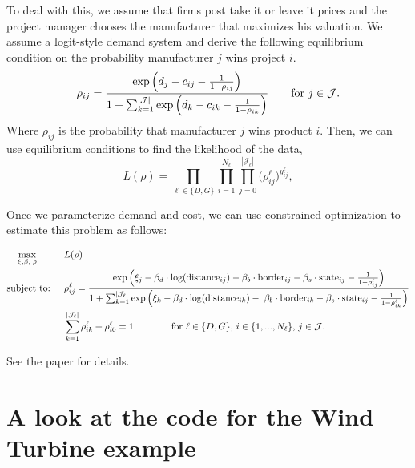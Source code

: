 \documentclass[twoside]{article}
\begin{document}
To deal with this, we assume that firms post take it or leave it prices and the project
manager chooses the manufacturer that maximizes his valuation. We assume a logit-style demand system and derive the 
following equilibrium condition on the probability manufacturer $j$ wins project $i$.   
\begin{equation*}
\rho_{ij}=\frac{\exp \left( d_{j}-c_{ij}-\frac{1}{1-\rho _{ij}}\right) }{%
1+\sum_{k=1}^{|\mathcal{J}|}\exp \left( d_k-c_{ik}-\frac{1}{1-\rho _{ik}}\right)}\quad\quad \mbox{for $j\in\mathcal{J}$}.
\label{eq:fixpt}
\end{equation*}
Where $\rho_{ij}$ is the probability that manufacturer $j$ wins product $i$.  Then, we can use equilibrium conditions to find the likelihood of the data, 
\begin{equation*}
L(\rho)=\prod_{\ell\in \{D, G\}}\prod_{i=1}^{N_{\ell}}\prod_{j=0}^{|\mathcal{J}_{\ell}|} \big(\rho^{\ell}_{ij}\big)^{y^{\ell}_{ij}},
\label{eq:likelihood}
\end{equation*}

Once we parameterize demand and cost, we can use constrained optimization to estimate this problem as follows: 

\begin{align*}
& ~~~\max_{\xi, \beta,\;\rho} & & L(\rho) \label{eq:maxprob} \\
&  \mbox{subject to: }
& & \rho^{\ell}_{ij}=\frac{\exp \left(\xi_j-\beta _{d}\cdot \mbox{log}(\mbox{distance}_{ij})-\beta _{b}\cdot \mbox{border}_{ij}
-\beta_{s}\cdot \mbox{state}_{ij}
-\frac{1}{1-\rho^{\ell} _{ij}}\right) }{%
1+\sum_{k=1}^{|\mathcal{J}_{\ell}|}\exp \left( \xi_k -\beta _{d}\cdot \mbox{log}(\mbox{distance}_{ik})-\;\beta _{b}\cdot \mbox{border}_{ik}
-\beta_{s}\cdot \mbox{state}_{ij}
-\frac{1}{1-\rho^{\ell} _{ik}}\right)} \notag \\
& &&\sum\limits_{k=1}^{|\mathcal{J}_{\ell}|}\rho^{\ell}_{ik}+\rho^{\ell}_{i0} =1\quad\quad\quad\quad\mbox{for $\ell\in\{D,G\}$, $i\in\{1,...,N_{\ell}\}$, $j\in\mathcal{J}$.} \notag
\end{align*}

See the paper for details. 

\section{A look at the code for the Wind Turbine example}
\end{document}
